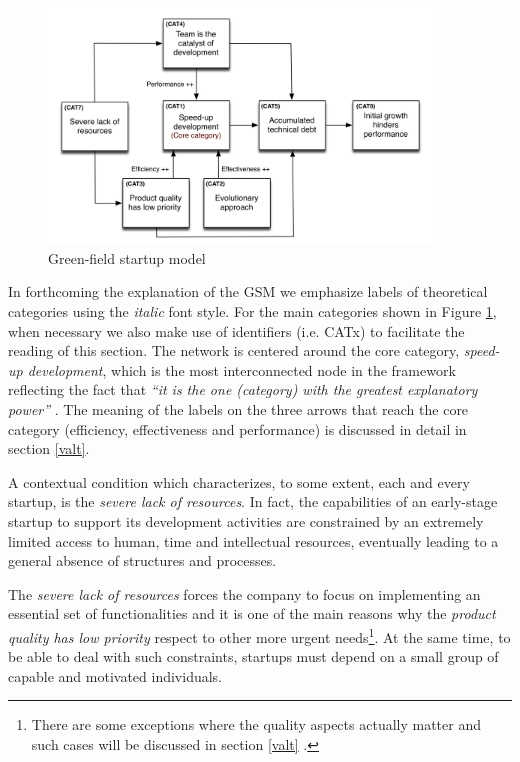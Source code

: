 \documentclass[10pt,journal,letterpaper,compsoc]{IEEEtran}
\begin{document}
\begin{figure}[!t]
\centering
\includegraphics[width=4in]{figures/high-level}
\caption{Green-field startup model}\label{fig:gsm}
\end{figure}

In forthcoming the explanation of the GSM we emphasize labels of theoretical categories using the \textit{italic} font style. For the main categories shown in Figure \ref{fig:gsm}, when necessary we also make use of identifiers (i.e. CATx) to facilitate the reading of this section.
The network is centered around the core category, \textit{speed-up development}, which is the most interconnected node in the framework reflecting the fact that \textit{``it is the one (category) with the greatest explanatory power''}  \cite{Strauss1998}. The meaning of the labels on the three arrows that reach the core category (efficiency, effectiveness and performance) is discussed in detail in section \ref{valt}. %

A contextual condition which characterizes, to some extent, each and every startup, is the \textit{severe lack of resources}. In fact, the capabilities of an early-stage startup to support its development activities are constrained by an extremely limited access to human, time and intellectual resources, eventually leading to a general absence of structures and processes.

The \textit{severe lack of resources} forces the company to focus on implementing an essential set of functionalities and it is one of the main reasons why the \textit{product quality has low priority} respect to other more urgent needs\footnote{There are some exceptions where the quality aspects actually matter and such cases will be discussed in section \ref{valt} %
.}. At the same time, to be able to deal with such constraints, startups must depend on a small group of capable and motivated individuals.
\end{document}
